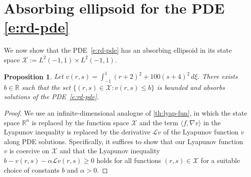 \documentclass[11pt]{amsart}
\numberwithin{equation}{section}
\theoremstyle{plain}
\newtheorem{proposition}{Proposition}[section]
\theoremstyle{definition}
\theoremstyle{remark}
\newcommand{\R}{\mathbb{R}}
\newcommand{\ip}[2]{\langle #1, #2 \rangle}
\begin{document}
\section{Absorbing ellipsoid for the PDE \texorpdfstring{\cref{e:rd-pde}}{(\ref{e:rd-pde})}}
\label{app:pde-boundedness}
We now show that the PDE~\cref{e:rd-pde} has an absorbing ellipsoid in its state space $\mathcal{X} := L^2(-1,1) \times L^2(-1,1)$.
\begin{proposition}
   Let $v(r,s) = \int_{-1}^1 (r+2)^2 + 100 (s+4)^2 \,d\xi$. There exists $b \in \R$ such that the set $\{(r,s)\in \mathcal{X}: v(r,s)\leq b\}$ is bounded and absorbs solutions of the PDE~\cref{e:rd-pde}.
\end{proposition}
\begin{proof}
    We use an infinite-dimensional analogue of \cref{th:lyap-fun}, in which the state space $\R^n$ is replaced by the function space $\mathcal{X}$ and the term $\ip{f}{\nabla v}$ in the Lyapunov inequality is replaced by the derivative $\mathcal{L}v$ of the Lyapunov function $v$ along PDE solutions. Specifically, it suffices to show that our Lyapunov function $v$ is coercive on $\mathcal{X}$ and that the Lyapunov inequality $b - v(r,s) - \alpha \mathcal{L}v(r,s) \geq 0$ holds for all functions $(r,s)\in\mathcal{X}$ for a suitable choice of constants $b$ and $\alpha>0$.
    

\end{proof}
\end{document}
